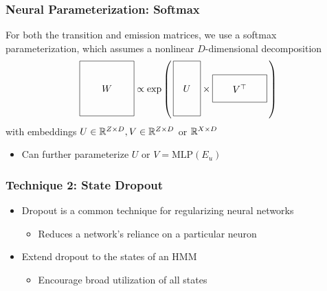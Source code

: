 \documentclass{beamer}
\begin{document}
\begin{frame}
\frametitle{Neural Parameterization: Softmax}
For both the transition and emission matrices,
we use a softmax parameterization,
which assumes a nonlinear $D$-dimensional decomposition
\vspace{1em}
\[
\vcenter{\hbox{\begin{tikzpicture}[baseline=-0.5ex]
    \draw (0,0) rectangle (2,2) node[pos=.5] {$W$};
\end{tikzpicture}}}
\propto
\exp\left(\,
\vcenter{\hbox{\begin{tikzpicture}[baseline=-0.5ex]
    \draw (0,0) rectangle (1,2) node[pos=.5] {$U$};
\end{tikzpicture}}}
\times 
\vcenter{\hbox{\begin{tikzpicture}[baseline=-0.5ex]
    \draw (0,0) rectangle (2,1) node[pos=.5] {$V^\top$};
\end{tikzpicture}}}
\,\right)
\]
\vspace{1em}
with embeddings $U\in\mathbb{R}^{Z\times D}, V\in\mathbb{R}^{Z\times D}$ or $\mathbb{R}^{X \times D}$
\vspace{1em}
\begin{itemize}
\item Can further parameterize $U$ or $V = \textrm{MLP}(E_u)$
\end{itemize}
\end{frame}

\begin{frame}
\frametitle{Technique 2: State Dropout}
\begin{itemize}
\item Dropout is a common technique for regularizing neural networks
\vspace{2em}
    \begin{itemize}
    \item Reduces a network's reliance on a particular neuron
    \end{itemize}
\vspace{2em}
\item Extend dropout to the states of an HMM
\vspace{2em}
    \begin{itemize}
    \item Encourage broad utilization of all states
    \end{itemize}
\end{itemize}
\end{frame}
\end{document}
